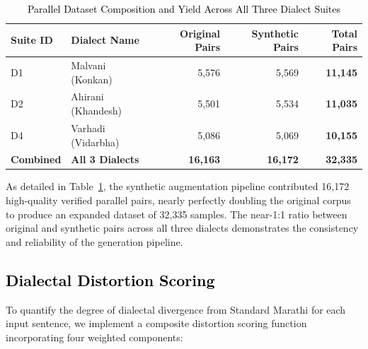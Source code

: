 \begin{table}[t]
\color{black}
\centering
\caption{\textcolor{black}{Parallel Dataset Composition and Yield Across All Three Dialect Suites}}
\label{tab:dataset_summary}
\begin{tabular}{llrrr}
\hline
\textbf{Suite ID} & \textbf{Dialect Name} & \textbf{Original Pairs} & \textbf{Synthetic Pairs} & \textbf{Total Pairs} \\
\hline
D1 & Malvani (Konkan)  & 5,576 & 5,569 & \textbf{11,145} \\
D2 & Ahirani (Khandesh) & 5,501 & 5,534 & \textbf{11,035} \\
D4 & Varhadi (Vidarbha) & 5,086 & 5,069 & \textbf{10,155} \\
\hline
\textbf{Combined} & \textbf{All 3 Dialects} & \textbf{16,163} & \textbf{16,172} & \textbf{32,335} \\
\hline
\end{tabular}
\end{table}

As detailed in Table~\ref{tab:dataset_summary}, the synthetic augmentation pipeline contributed 16,172 high-quality verified parallel pairs, nearly perfectly doubling the original corpus to produce an expanded dataset of 32,335 samples. The near-1:1 ratio between original and synthetic pairs across all three dialects demonstrates the consistency and reliability of the generation pipeline.


\subsection{\textcolor{black}{Dialectal Distortion Scoring}}

To quantify the degree of dialectal divergence from Standard Marathi for each input sentence, we implement a composite distortion scoring function incorporating four weighted components:

